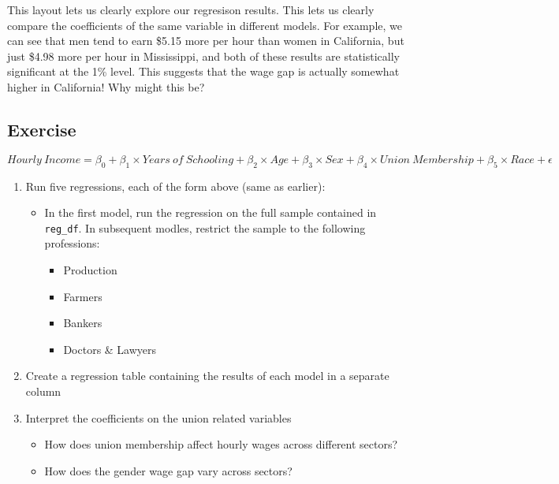 \documentclass[
  letterpaper,
  DIV=11,
  numbers=noendperiod]{scrreprt}
\providecommand{\tightlist}{%
  \setlength{\itemsep}{0pt}\setlength{\parskip}{0pt}}\usepackage{longtable,booktabs,array}
\begin{document}
This layout lets us clearly explore our regresison results. This lets us
clearly compare the coefficients of the same variable in different
models. For example, we can see that men tend to earn \$5.15 more per
hour than women in California, but just \$4.98 more per hour in
Mississippi, and both of these results are statistically significant at
the 1\% level. This suggests that the wage gap is actually somewhat
higher in California! Why might this be?

\hypertarget{exercise-25}{%
\subsection{Exercise}\label{exercise-25}}

\[ Hourly\ Income= \beta_0 + \beta_1 \times Years\ of\ Schooling + \beta_2 \times Age + \beta_3 \times Sex + \beta_4 \times Union\ Membership + \beta_5 \times Race +\epsilon \]

\begin{enumerate}
\def\labelenumi{\arabic{enumi}.}
\tightlist
\item
  Run five regressions, each of the form above (same as earlier):

  \begin{itemize}
  \tightlist
  \item
    In the first model, run the regression on the full sample contained
    in \texttt{reg\_df}. In subsequent modles, restrict the sample to
    the following professions:

    \begin{itemize}
    \tightlist
    \item
      Production
    \item
      Farmers
    \item
      Bankers
    \item
      Doctors \& Lawyers
    \end{itemize}
  \end{itemize}
\item
  Create a regression table containing the results of each model in a
  separate column
\item
  Interpret the coefficients on the union related variables

  \begin{itemize}
  \tightlist
  \item
    How does union membership affect hourly wages across different
    sectors?
  \item
    How does the gender wage gap vary across sectors?
  \end{itemize}
\end{enumerate}
\end{document}
